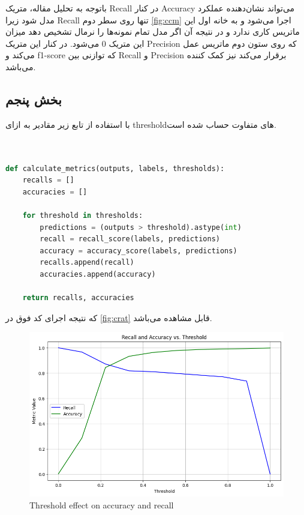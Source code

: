 \documentclass{article}
\begin{document}
باتوجه به تحلیل مقاله، متریک Recall در کنار Accuracy می‌تواند نشان‌دهنده عملکرد مدل شود زیرا Recall تنها روی  سطر دوم ‎\autoref{fig:ccm} اجرا می‌شود و به خانه اول این ماتریس کاری ندارد و در نتیجه آن اگر مدل تمام نمونه‌ها را نرمال تشخیص دهد میزان این متریک 0 می‌شود. در کنار این متریک Precision که روی ستون دوم ماتریس عمل می‌کند و f1-score که توازنی بین Recall و Precision برقرار می‌کند نیز کمک کننده می‌باشد.

\subsection{بخش پنجم}
با استفاده از تابع زیر مقادیر به ازای thresholdهای متفاوت حساب شده است.

\begin{LTR}
	\begin{lstlisting}[language=Python, caption=Thresholding]


def calculate_metrics(outputs, labels, thresholds):
    recalls = []
    accuracies = []

    for threshold in thresholds:
        predictions = (outputs > threshold).astype(int)
        recall = recall_score(labels, predictions)
        accuracy = accuracy_score(labels, predictions)
        recalls.append(recall)
        accuracies.append(accuracy)

    return recalls, accuracies
   	\end{lstlisting}
   \end{LTR} 
که نتیجه اجرای کد فوق در ‎\autoref{fig:crat}‎ قابل مشاهده می‌باشد.
\begin{figure}[H]
\centering
\includegraphics[width=1\linewidth]{img/C_RA_T}
\caption{Threshold effect on accuracy and recall}
\label{fig:crat}
\end{figure}
\end{document}
